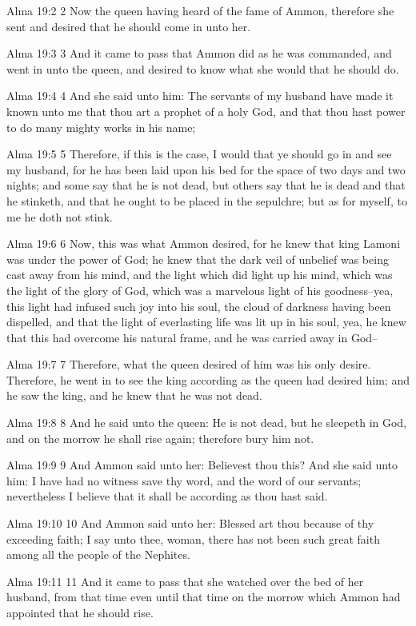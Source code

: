 Alma 19:2
 2 Now the queen having heard of the fame of Ammon, therefore she
sent and desired that he should come in unto her.

Alma 19:3
 3 And it came to pass that Ammon did as he was commanded, and
went in unto the queen, and desired to know what she would that
he should do.

Alma 19:4
 4 And she said unto him: The servants of my husband have made it
known unto me that thou art a prophet of a holy God, and that
thou hast power to do many mighty works in his name;

Alma 19:5
 5 Therefore, if this is the case, I would that ye should go in
and see my husband, for he has been laid upon his bed for the
space of two days and two nights; and some say that he is not
dead, but others say that he is dead and that he stinketh, and
that he ought to be placed in the sepulchre; but as for myself,
to me he doth not stink.

Alma 19:6
 6 Now, this was what Ammon desired, for he knew that king Lamoni
was under the power of God; he knew that the dark veil of
unbelief was being cast away from his mind, and the light which
did light up his mind, which was the light of the glory of God,
which was a marvelous light of his goodness--yea, this light had
infused such joy into his soul, the cloud of darkness having been
dispelled, and that the light of everlasting life was lit up in
his soul, yea, he knew that this had overcome his natural frame,
and he was carried away in God--

Alma 19:7
 7 Therefore, what the queen desired of him was his only desire.
Therefore, he went in to see the king according as the queen had
desired him; and he saw the king, and he knew that he was not
dead.

Alma 19:8
 8 And he said unto the queen: He is not dead, but he sleepeth in
God, and on the morrow he shall rise again; therefore bury him
not.

Alma 19:9
 9 And Ammon said unto her: Believest thou this? And she said
unto him: I have had no witness save thy word, and the word of
our servants; nevertheless I believe that it shall be according
as thou hast said.

Alma 19:10
 10 And Ammon said unto her: Blessed art thou because of thy
exceeding faith; I say unto thee, woman, there has not been such
great faith among all the people of the Nephites.

Alma 19:11
 11 And it came to pass that she watched over the bed of her
husband, from that time even until that time on the morrow which
Ammon had appointed that he should rise.

